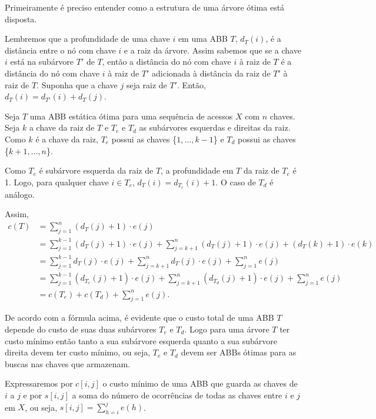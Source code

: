 Primeiramente é preciso entender como a estrutura de uma árvore ótima está disposta.

Lembremos que a profundidade de uma chave $i$ em uma ABB $T$, $d_T(i)$, é a distância entre o nó com chave $i$ e a raiz da árvore. Assim sabemos que se a chave $i$ está na subárvore $T'$ de $T$, então a distância do nó com chave $i$ à raiz de $T$ é a distância do nó com chave $i$ à raiz de $T'$ adicionada à distância da raiz de $T'$ à raiz de $T$. Suponha que a chave $j$ seja raiz de $T'$. Então, $d_T(i) = d_{T'}(i) + d_{T}(j)$.

Seja $T$ uma ABB estática ótima para uma sequência de acessos $X$ com $n$ chaves. Seja $k$ a chave da raiz de $T$ e $T_e$ e $T_d$ as subárvores esquerdas e direitas da raiz. Como $k$ é a chave da raiz, $T_e$ possui as chaves \{$1,\ldots,k-1$\} e $T_d$ possui as chaves \{$k+1,\ldots,n$\}. 

Como $T_e$ é subárvore esquerda da raiz de $T$, a profundidade em $T$ da raiz de $T_e$ é 1. Logo, para qualquer chave $i \in T_e$, $d_T(i) = d_{T_{e}}(i) + 1$. O caso de $T_d$ é análogo.

Assim,
\begin{align*}
  c(T) &= \sum_{j=1}^{n}(d_T(j) + 1)\cdot e(j) \\
  &= \sum_{j=1}^{k-1}(d_T(j) + 1) \cdot e(j) + \sum_{j=k+1}^{n}(d_T(j) + 1)\cdot e(j) + (d_T(k) + 1)\cdot e(k) \\
  &= \sum_{j=1}^{k-1}d_T(j) \cdot e(j) + \sum_{j=k+1}^{n}d_T(j)\cdot e(j) + \sum_{j=1}^{n} e(j) \\
  &= \sum_{j=1}^{k-1}(d_{T_e}(j) + 1)\cdot e(j) + \sum_{j=k+1}^{n}(d_{T_d}(j) + 1)\cdot e(j) + \sum_{j=1}^{n} e(j) \\
  &= c(T_e) + c(T_d) + \sum_{j=1}^{n}e(j).
\end{align*}

De acordo com a fórmula acima, é evidente que o custo total de uma ABB $T$ depende do custo de suas duas subárvores $T_e$ e $T_d$. Logo para uma árvore $T$ ter custo mínimo então tanto a sua subárvore esquerda quanto a sua subárvore direita devem ter custo mínimo, ou seja, $T_e$ e $T_d$ devem ser ABBs ótimas para as buscas nas chaves que armazenam.

Expressaremos por $c[i,j]$ o custo mínimo de uma ABB que guarda as chaves de $i$ a $j$ e por $s[i,j]$ a soma do número de ocorrências de todas as chaves entre $i$ e $j$ em $X$, ou seja, $s[i,j] = \sum_{h=i}^{j} e(h)$.


